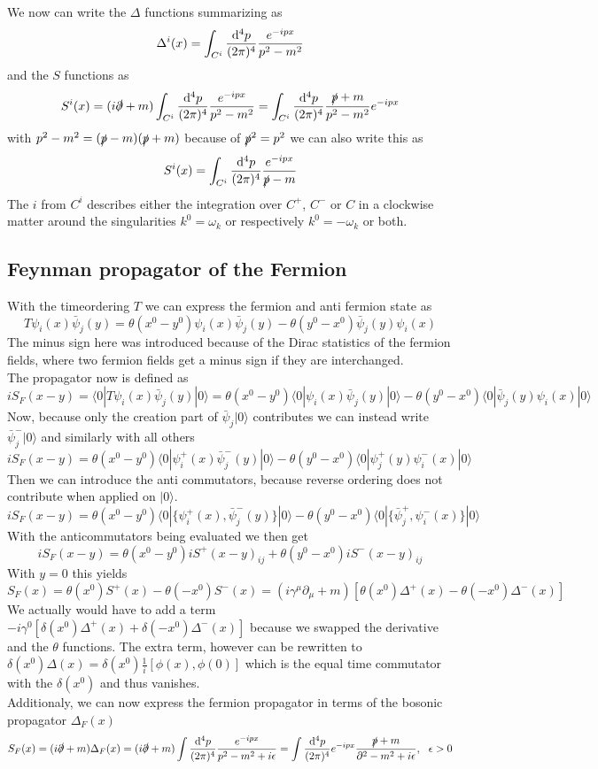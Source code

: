 \documentclass{include/thesisclass}
\newcommand{\rk}{\rangle}
\newcommand{\lk}{\langle}
\newcommand{\dd}{{\rm d}}
\newcommand{\p}{\partial}
\newcommand{\eps}{\epsilon}
\begin{document}
We now can write the $\Delta$ functions summarizing as
\[ \Delta ^i(x) = \int _{C^i} \frac{\dd ^4 p}{(2\pi)^4} \frac{e^{-ipx}}{p^2-m^2}\]
and the $S$ functions as
\[ S^i(x) = (i \slashed \p +m) \int _{C^i} \frac{\dd ^4 p}{(2\pi)^4} \frac{e^{-ipx}}{p^2-m^2} = \int _{C^i} \frac{\dd ^4 p}{(2\pi)^4} \frac{\slashed p + m}{p^2 - m^2} e^{-ipx}\]
with $p^2-m^2 = (\slashed p - m ) (\slashed p + m)$ because of $\slashed p ^2 = p^2$ we can also write this as
\[ S^i(x) = \int_{C^i} \frac{\dd ^4 p}{(2\pi)^4} \frac{e^{-ipx}}{\slashed p - m}\]
The $i$ from $C^i$ describes either the integration over $C^+$, $C^-$ or $C$ in a clockwise matter around the singularities $k^0 = \omega_k$ or respectively $k^0 = - \omega_k$ or both.

\subsection{Feynman propagator of the Fermion}
With the timeordering $T$ we can express the fermion and anti fermion state as
\[ T \psi_i (x) \bar \psi_j(y) = \theta(x^0 - y^0) \psi_i(x) \bar \psi_j(y) - \theta(y^0 - x^0) \bar \psi_j(y) \psi_i(x) \]
The minus sign here was introduced because of the Dirac statistics of the fermion fields, where two fermion fields get a minus sign if they are interchanged.\\
The propagator now is defined as
\[ i S_F(x-y) = \lk 0 | T \psi_i(x) \bar \psi_j(y) | 0 \rk = \theta(x^0-y^0) \lk 0 | \psi_i(x) \bar \psi_j(y) | 0 \rk - \theta(y^0 - x^0) \lk 0 | \bar \psi_j(y) \psi_i(x) | 0 \rk \]
Now, because only the creation part of $\bar \psi_j | 0 \rk$ contributes we can instead write $ \bar \psi_j^- | 0 \rk$ and similarly with all others
\[ i S_F(x-y) = \theta(x^0 - y^0) \lk 0 | \psi_i^+(x) \bar \psi_j^-(y) | 0 \rk - \theta(y^0 - x^0) \lk 0 | \psi^+_j (y) \psi_i^-(x) | 0 \rk \]
Then we can introduce the anti commutators, because reverse ordering does not contribute when applied on $ | 0 \rk$.
\[ i S_F(x-y) = \theta(x^0 - y^0) \lk 0 | \{ \psi_i^+(x), \bar \psi_j^-(y) \} | 0 \rk - \theta(y^0-x^0) \lk 0 | \{ \bar \psi_j^+, \psi_i^-(x)\} | 0 \rk\]
With the anticommutators being evaluated we then get
\[ i S_F(x-y) = \theta(x^0 - y^0) i S^+(x-y)_{ij} + \theta(y^0 - x^0) i S^-(x-y)_{ij}\]
With $y = 0$ this yields
\[ S_F(x) = \theta(x^0) S^+(x) - \theta(-x^0) S^-(x) = ( i \gamma^\mu \p_\mu + m) \left[ \theta (x^0) \Delta^+(x) - \theta(-x^0) \Delta^-(x)\right]\]
We actually would have to add a term $-i \gamma^0 \left[ \delta(x^0) \Delta^+(x) + \delta(-x^0) \Delta^-(x) \right]$ because we swapped the derivative and the $\theta$ functions.
The extra term, however can be rewritten to $\delta(x^0) \Delta(x) = \delta(x^0) \frac{1}{i} [ \phi(x), \phi(0)]$ which is the equal time commutator with the  $\delta(x^0)$ and thus vanishes.\\
Additionaly, we can now express the fermion propagator in terms of the bosonic propagator $\Delta_F(x)$
\[ S_F(x) = ( i \slashed \p + m) \Delta_F(x) = ( i \slashed \p + m) \int \frac{ \dd ^4 p}{(2\pi)^4} \frac{e^{-ipx}}{p^2 - m^2 + i \eps} = \int \frac{\dd ^4 p}{(2\pi)^4} e^{-ipx} \frac{ \slashed p + m}{\p^2 -m^2 + i \eps}, ~~\eps > 0\]
\end{document}
